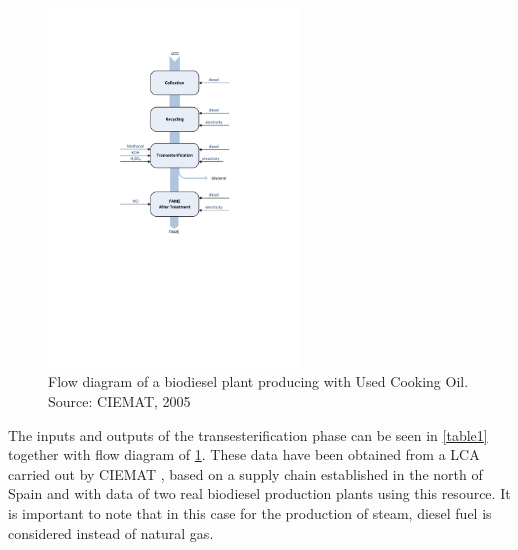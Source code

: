 \documentclass[sustainability,article,submit,moreauthors,pdftex,12pt,a4paper]{mdpi}
\begin{document}
\begin{figure}[htbp]
\centering
\includegraphics[width=0.6\textwidth]{Figure1}
\caption[Flow diagram of a biodiesel plant producing with Used Cooking Oil]{Flow diagram of a biodiesel plant producing with Used Cooking Oil. Source: CIEMAT, 2005}
\label{fig1}
\end{figure}

The inputs and outputs of the transesterification phase can be seen in \cref{table1} together with flow diagram of \cref{fig1}. These data have been obtained from a LCA carried out by CIEMAT \cite{CIEMAT2005}, based on a supply chain established in the north of Spain and with data of two real biodiesel production plants using this resource. It is important to note that in this case for the production of steam, diesel fuel is considered instead of natural gas.
\end{document}
